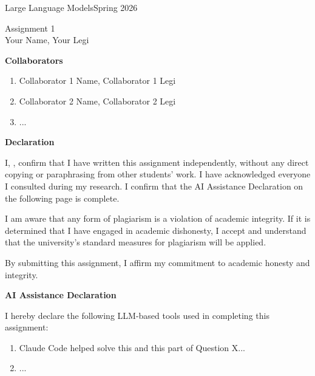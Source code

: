 \documentclass[a4paper,12pt]{ETHexercise}
\begin{document}
{\Large Large Language Models}{Spring 2026}

\vspace{5mm}
\begin{center}
    {\Huge Assignment 1 \\ \vspace{5mm} \Large Your Name, Your Legi}\\
\end{center}

\vspace{3cm}

\begin{center}
    {\large \textbf{Collaborators}}
    \begin{enumerate}
        \item Collaborator 1 Name, Collaborator 1 Legi
        \item Collaborator 2 Name, Collaborator 2 Legi
        \item ...
    \end{enumerate}
\end{center}

\begin{center}
    {\large \textbf{Declaration}}
\end{center}

I, \textcolor{ETHGreen}{}, confirm that I have written this assignment independently, without any direct copying or paraphrasing from other students' work. 
I have acknowledged everyone I consulted during my research.
I confirm that the AI Assistance Declaration on the following page is complete.

I am aware that any form of plagiarism is a violation of academic integrity. If it is determined that I have engaged in academic dishonesty, I accept and understand that the university's standard measures for plagiarism will be applied.

By submitting this assignment, I affirm my commitment to academic honesty and integrity.


\vspace{5em}
\begin{center}
    {\large \textbf{AI Assistance Declaration}}
\end{center}

I hereby declare the following LLM-based tools used in completing this assignment:

\begin{center}
    \begin{enumerate}
        \item Claude Code helped solve this and this part of Question X...
        \item ...
    \end{enumerate}
\end{center}
\vspace{10em}

\newpage

\end{document}
